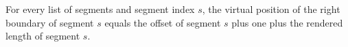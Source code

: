\begin{lemma}
\label{Complexity.LogProg.vpos_right}
\leanok
{}
For every list of segments and segment index $s$, the virtual position of the right
boundary of segment $s$ equals the offset of segment $s$ plus one plus the rendered
length of segment $s$.
\end{lemma}
